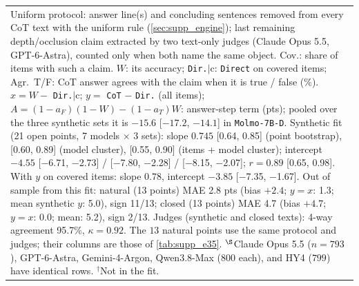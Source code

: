 \begin{tabular}{llrrrrrrrrrrr}
\multicolumn{13}{p{0.98\linewidth}}{\scriptsize Uniform protocol: answer line(s) and concluding sentences removed from every CoT text with the uniform rule (\cref{sec:supp_engine}); last remaining depth/occlusion claim extracted by two text-only judges (Claude Opus 5.5, GPT-6-Astra), counted only when both name the same object. Cov.: share of items with such a claim. $W$: its accuracy; \texttt{Dir.}$|$c: \texttt{Direct} on covered items; Agr.\ T/F: CoT answer agrees with the claim when it is true / false (\%). $x = W -$ \texttt{Dir.}$|$c; $y =$ \texttt{CoT} $-$ \texttt{Dir.} (all items); $A = (1-a_F)(1-W) - (1-a_T)W$: answer-step term (pts); pooled over the three synthetic sets it is $-15.6$ [$-17.2$, $-14.1$] in \texttt{Molmo-7B-D}. Synthetic fit (21 open points, 7 models $\times$ 3 sets): slope $0.745$ [0.64, 0.85] (point bootstrap), [0.60, 0.89] (model cluster), [0.55, 0.90] (items + model cluster); intercept $-4.55$ [$-$6.71, $-$2.73] / [$-$7.80, $-$2.28] / [$-$8.15, $-$2.07]; $r=0.89$ [0.65, 0.98]. With $y$ on covered items: slope $0.78$, intercept $-3.85$ [$-$7.35, $-$1.67]. Out of sample from this fit: natural (13 points) MAE 2.8 pts (bias $+2.4$; $y=x$: 1.3; mean synthetic $y$: 5.0), sign 11/13; closed (13 points) MAE 4.7 (bias $+4.7$; $y=x$: 0.0; mean: 5.2), sign 2/13. Judges (synthetic and closed texts): 4-way agreement 95.7\%, $\kappa=0.92$. The $13$ natural points use the same protocol and judges; their columns are those of \cref{tab:supp_e35}. $^\S$Claude Opus 5.5 ($n=793$), GPT-6-Astra, Gemini-4-Argon, Qwen3.8-Max ($800$ each), and HY4 ($799$) have identical rows. $^\dagger$Not in the fit.} \\
\end{tabular}
